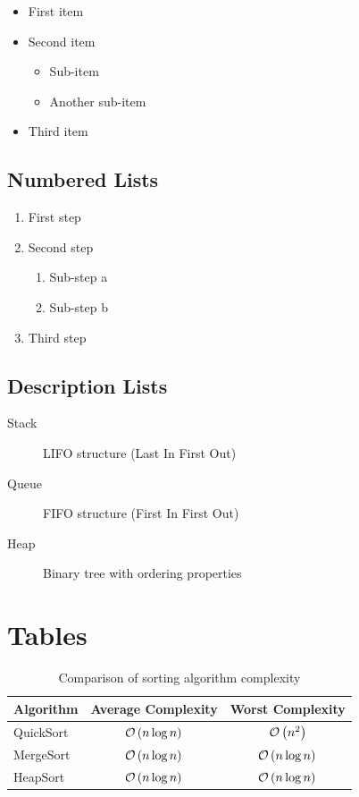 \documentclass[]{csnotes}
\begin{document}
\begin{itemize}
    \item First item
    \item Second item
    \begin{itemize}
        \item Sub-item
        \item Another sub-item
    \end{itemize}
    \item Third item
\end{itemize}

\subsection{Numbered Lists}

\begin{enumerate}
    \item First step
    \item Second step
    \begin{enumerate}
        \item Sub-step a
        \item Sub-step b
    \end{enumerate}
    \item Third step
\end{enumerate}

\subsection{Description Lists}

\begin{description}
    \item[Stack] LIFO structure (Last In First Out)
    \item[Queue] FIFO structure (First In First Out)
    \item[Heap] Binary tree with ordering properties
\end{description}


\section{Tables}

\begin{table}[h]
\centering
\begin{tabular}{|l|c|c|}
\hline
\textbf{Algorithm} & \textbf{Average Complexity} & \textbf{Worst Complexity} \\
\hline
QuickSort & \(\mathcal{O}\left(n \log n\right)\) & \(\mathcal{O}\left(n^2\right)\) \\
MergeSort & \(\mathcal{O}\left(n \log n\right)\) & \(\mathcal{O}\left(n \log n\right)\) \\
HeapSort & \(\mathcal{O}\left(n \log n\right)\) & \(\mathcal{O}\left(n \log n\right)\) \\
\hline
\end{tabular}
\caption{Comparison of sorting algorithm complexity}
\label{tab:sorting}
\end{table}
\end{document}
